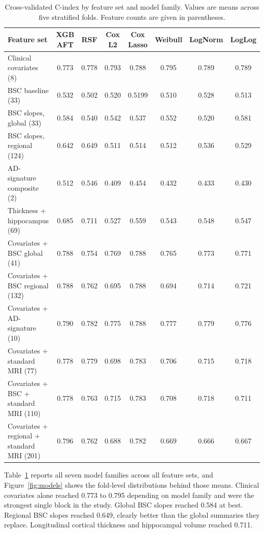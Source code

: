 \documentclass[blue]{ludusofficial}  %
\begin{document}
\begin{table}[t!]
\centering
\caption{Cross-validated C-index by feature set and model family. Values are means across five stratified folds. Feature counts are given in parentheses.}
\label{tab:model-performance}
\begin{tabular}{lccccccc}
\hline
\textbf{Feature set} & \textbf{XGB AFT} & \textbf{RSF} & \textbf{Cox L2} & \textbf{Cox Lasso} & \textbf{Weibull} & \textbf{LogNorm} & \textbf{LogLog} \\
\hline
Clinical covariates (8) & 0.773 & 0.778 & 0.793 & 0.788 & 0.795 & 0.789 & 0.789 \\
BSC baseline (33) & 0.532 & 0.502 & 0.520 & 0.5199 & 0.510 & 0.528 & 0.513 \\
BSC slopes, global (33) & 0.584 & 0.540 & 0.542 & 0.537 & 0.552 & 0.520 & 0.581 \\
BSC slopes, regional (124) & 0.642 & 0.649 & 0.511 & 0.514 & 0.512 & 0.536 & 0.529 \\
AD-signature composite (2) & 0.512 & 0.546 & 0.409 & 0.454 & 0.432 & 0.433 & 0.430 \\
Thickness + hippocampus (69) & 0.685 & 0.711 & 0.527 & 0.559 & 0.543 & 0.548 & 0.547 \\
\hline
Covariates + BSC global (41) & 0.788 & 0.754 & 0.769 & 0.788 & 0.765 & 0.773 & 0.771 \\
Covariates + BSC regional (132) & 0.788 & 0.762 & 0.695 & 0.788 & 0.694 & 0.714 & 0.721 \\
Covariates + AD-signature (10) & 0.790 & 0.782 & 0.775 & 0.788 & 0.777 & 0.779 & 0.776 \\
Covariates + standard MRI (77) & 0.778 & 0.779 & 0.698 & 0.783 & 0.706 & 0.715 & 0.718 \\
Covariates + BSC + standard MRI (110) & 0.778 & 0.763 & 0.715 & 0.783 & 0.708 & 0.718 & 0.711 \\
Covariates + regional + standard MRI (201) & 0.796 & 0.762 & 0.688 & 0.782 & 0.669 & 0.666 & 0.667 \\
\hline
\end{tabular}
\end{table}

Table~\ref{tab:model-performance} reports all seven model families across all feature sets, and Figure~\ref{fig:models} shows the fold-level distributions behind those means. Clinical covariates alone reached 0.773 to 0.795 depending on model family and were the strongest single block in the study. Global BSC slopes reached 0.584 at best. Regional BSC slopes reached 0.649, clearly better than the global summaries they replace. Longitudinal cortical thickness and hippocampal volume reached 0.711.
\end{document}
